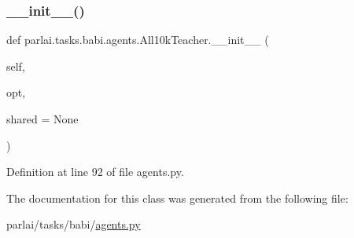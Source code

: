 \subsubsection{\texorpdfstring{\+\_\+\+\_\+init\+\_\+\+\_\+()}{\_\_init\_\_()}}
{\footnotesize\ttfamily def parlai.\+tasks.\+babi.\+agents.\+All10k\+Teacher.\+\_\+\+\_\+init\+\_\+\+\_\+ (\begin{DoxyParamCaption}\item[{}]{self,  }\item[{}]{opt,  }\item[{}]{shared = {\ttfamily None} }\end{DoxyParamCaption})}



Definition at line 92 of file agents.\+py.




The documentation for this class was generated from the following file\+:\begin{DoxyCompactItemize}
\item 
parlai/tasks/babi/\hyperlink{parlai_2tasks_2babi_2agents_8py}{agents.\+py}\end{DoxyCompactItemize}

